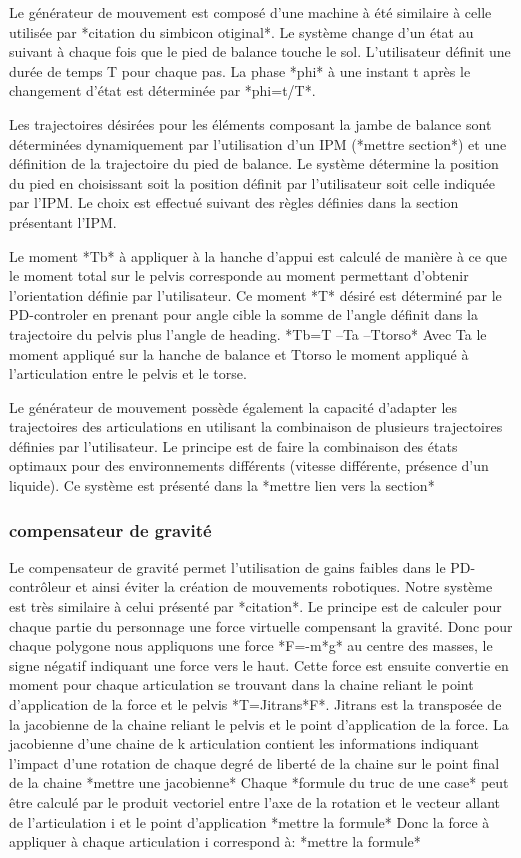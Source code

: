\documentclass{llncs}
\begin{document}
	Le générateur de mouvement est composé d'une machine à été similaire à celle utilisée par *citation du simbicon otiginal*. Le système change d'un état au suivant à chaque fois que le pied de balance touche le sol. L'utilisateur définit une durée de temps T pour chaque pas. La phase *phi* à une instant t après le changement d'état est déterminée par *phi=t/T*.

	Les trajectoires désirées pour les éléments composant la jambe de balance sont déterminées dynamiquement par l'utilisation d'un IPM (*mettre section*) et une définition de la trajectoire du pied de balance. Le système détermine la position du pied en choisissant soit la position définit par l'utilisateur soit celle indiquée par l'IPM. Le choix est effectué suivant des règles définies dans la section présentant l'IPM.

	Le moment *Tb* à appliquer à la hanche d'appui est calculé de manière à ce que le moment total sur le pelvis corresponde au moment permettant d'obtenir l'orientation définie par l'utilisateur. Ce moment *T* désiré est déterminé par le PD-controler en prenant pour angle cible la somme de l'angle définit dans la trajectoire du pelvis plus l'angle de heading.
	*Tb=T –Ta –Ttorso*
Avec Ta le moment appliqué sur la hanche de balance et Ttorso le moment appliqué à l'articulation entre le pelvis et le torse.

	Le générateur de mouvement possède également la capacité d'adapter les trajectoires des articulations en utilisant la combinaison de plusieurs trajectoires définies par l'utilisateur. Le principe est de faire la combinaison des états optimaux pour des environnements différents (vitesse différente, présence d'un liquide). Ce système est présenté dans la *mettre lien vers la section*

\subsubsection{compensateur de gravité}

Le compensateur de gravité permet l'utilisation de gains faibles dans le PD-contrôleur et ainsi éviter la création de mouvements robotiques. Notre système est très similaire à celui présenté par *citation*. Le principe est de calculer pour chaque partie du personnage une force virtuelle compensant la gravité. Donc pour chaque polygone nous appliquons une force *F=-m*g* au centre des masses, le signe négatif indiquant une force vers le haut. Cette force est ensuite convertie en moment pour chaque articulation se trouvant dans la chaine reliant le point d'application de la force et le pelvis *T=Jitrans*F*. Jitrans est la transposée de la jacobienne de la chaine reliant le pelvis et le point d'application de la force.
La jacobienne d'une chaine de k articulation contient les informations indiquant l'impact d'une rotation de chaque degré de liberté de la chaine sur le point final de la chaine
*mettre une jacobienne*
Chaque *formule du truc de une case* peut être calculé par le produit vectoriel entre l'axe de la rotation et le vecteur allant de l'articulation i et le point d'application
*mettre la formule*
Donc la force à appliquer à chaque articulation i correspond à:
*mettre la formule*
\end{document}
